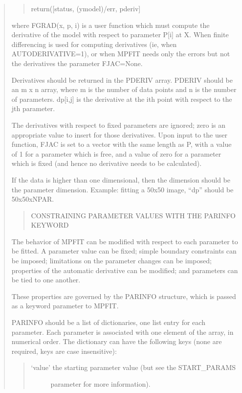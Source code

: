 \documentclass[letterpaper,10pt,english]{sphinxmanual}
\begin{document}
\begin{quote}
\begin{quote}
\begin{description}
return({[}status, (y\sphinxhyphen{}model)/err, pderiv{]}

\end{description}
\end{quote}

where FGRAD(x, p, i) is a user function which must compute the
derivative of the model with respect to parameter P{[}i{]} at X.  When
finite differencing is used for computing derivatives (ie, when
AUTODERIVATIVE=1), or when MPFIT needs only the errors but not the
derivatives the parameter FJAC=None.

Derivatives should be returned in the PDERIV array. PDERIV should be an m x
n array, where m is the number of data points and n is the number
of parameters.  dp{[}i,j{]} is the derivative at the ith point with
respect to the jth parameter.

The derivatives with respect to fixed parameters are ignored; zero
is an appropriate value to insert for those derivatives.  Upon
input to the user function, FJAC is set to a vector with the same
length as P, with a value of 1 for a parameter which is free, and a
value of zero for a parameter which is fixed (and hence no
derivative needs to be calculated).

If the data is higher than one dimensional, then the 
dimension should be the parameter dimension.  Example: fitting a
50x50 image, “dp” should be 50x50xNPAR.
\begin{quote}

CONSTRAINING PARAMETER VALUES WITH THE PARINFO KEYWORD
\end{quote}

The behavior of MPFIT can be modified with respect to each
parameter to be fitted.  A parameter value can be fixed; simple
boundary constraints can be imposed; limitations on the parameter
changes can be imposed; properties of the automatic derivative can
be modified; and parameters can be tied to one another.

These properties are governed by the PARINFO structure, which is
passed as a keyword parameter to MPFIT.

PARINFO should be a list of dictionaries, one list entry for each parameter.
Each parameter is associated with one element of the array, in
numerical order.  The dictionary can have the following keys
(none are required, keys are case insensitive):
\begin{quote}
\begin{description}
\item[{‘value’ \sphinxhyphen{} the starting parameter value (but see the START\_PARAMS}] \leavevmode
parameter for more information).


\end{description}
\end{quote}
\end{quote}
\end{document}
